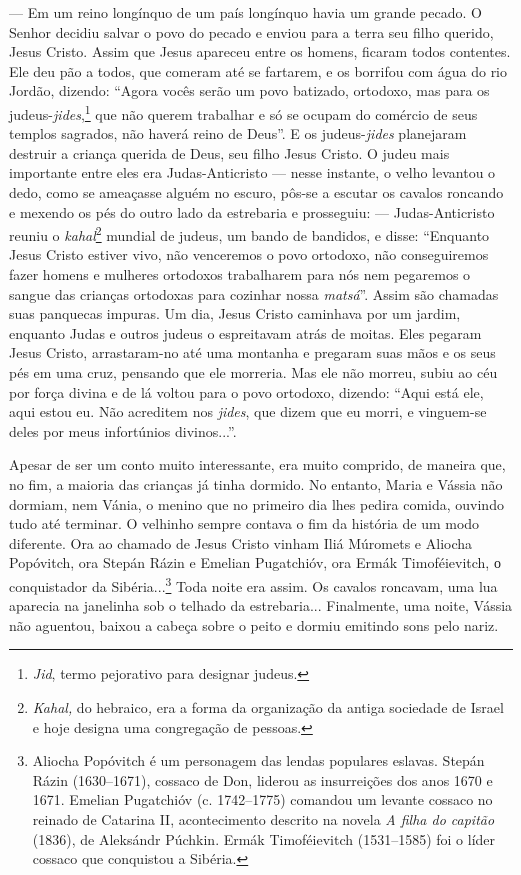 --- Em um reino longínquo de um país longínquo havia um grande pecado. O
Senhor decidiu salvar o povo do pecado e enviou para a terra seu filho
querido, Jesus Cristo. Assim que Jesus apareceu entre os homens, ficaram
todos contentes. Ele deu pão a todos, que comeram até se fartarem, e os
borrifou com água do rio Jordão, dizendo: ``Agora vocês serão um povo
batizado, ortodoxo, mas para os judeus-\emph{jides},\footnote{\emph{Jid},
  termo pejorativo para designar judeus.} que não querem trabalhar e só
se ocupam do comércio de seus templos sagrados, não haverá reino de
Deus''. E os judeus-\emph{jides} planejaram destruir a criança querida
de Deus, seu filho Jesus Cristo. O judeu mais importante entre eles era
Judas-Anticristo --- nesse instante, o velho levantou o dedo, como se
ameaçasse alguém no escuro, pôs-se a escutar os cavalos roncando e
mexendo os pés do outro lado da estrebaria e prosseguiu: ---
Judas-Anticristo reuniu o \emph{kahal}\footnote{\emph{Kahal,} do
  hebraico\emph{,} era a forma da organização da antiga sociedade de
  Israel e hoje designa uma congregação de pessoas.} mundial de judeus,
um bando de bandidos, e disse: ``Enquanto Jesus Cristo estiver vivo, não
venceremos o povo ortodoxo, não conseguiremos fazer homens e mulheres
ortodoxos trabalharem para nós nem pegaremos o sangue das crianças
ortodoxas para cozinhar nossa \emph{matsá}''. Assim são chamadas suas
panquecas impuras. Um dia, Jesus Cristo caminhava por um jardim,
enquanto Judas e outros judeus o espreitavam atrás de moitas. Eles
pegaram Jesus Cristo, arrastaram-no até uma montanha e pregaram suas
mãos e os seus pés em uma cruz, pensando que ele morreria. Mas ele não
morreu, subiu ao céu por força divina e de lá voltou para o povo
ortodoxo, dizendo: ``Aqui está ele, aqui estou eu. Não acreditem nos
\emph{jides}, que dizem que eu morri, e vinguem-se deles por meus
infortúnios divinos...''.

Apesar de ser um conto muito interessante, era muito comprido, de
maneira que, no fim, a maioria das crianças já tinha dormido. No
entanto, Maria e Vássia não dormiam, nem Vánia, o menino que no primeiro
dia lhes pedira comida, ouvindo tudo até terminar. O velhinho sempre
contava o fim da história de um modo diferente. Ora ao chamado de Jesus
Cristo vinham Iliá Múromets e Aliocha Popóvitch, ora Stepán Rázin e
Emelian Pugatchióv, ora Ermák Timoféievitch, о conquistador da
Sibéria...\footnote{Aliocha Popóvitch é um personagem das lendas
  populares eslavas. Stepán Rázin (1630--1671), cossaco de Don, liderou
  as insurreições dos anos 1670 e 1671. Emelian Pugatchióv (c.
  1742--1775) comandou um levante cossaco no reinado de Catarina II,
  acontecimento descrito na novela \emph{A filha do capitão} (1836), de
  Aleksándr Púchkin. Ermák Timoféievitch (1531--1585) foi o líder
  cossaco que conquistou a Sibéria.} Toda noite era assim. Os cavalos
roncavam, uma lua aparecia na janelinha sob o telhado da estrebaria...
Finalmente, uma noite, Vássia não aguentou, baixou a cabeça sobre o
peito e dormiu emitindo sons pelo nariz.

